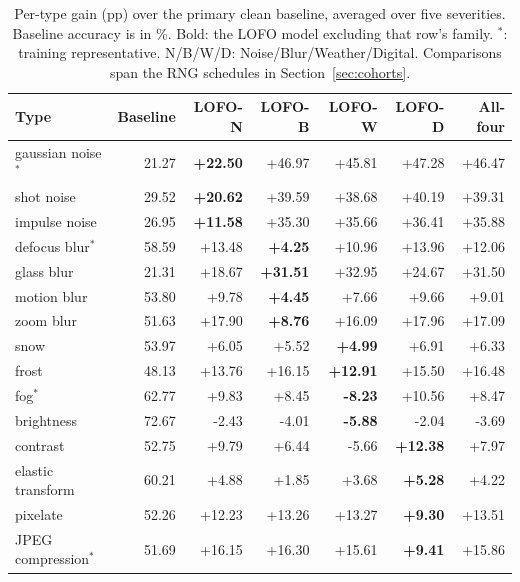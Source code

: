 \begin{table}[!htbp]
\caption{Per-type gain (pp) over the primary clean baseline, averaged over five severities. Baseline accuracy is in \%. Bold: the LOFO model excluding that row's family. $^{*}$: training representative. N/B/W/D: Noise/Blur/Weather/Digital. Comparisons span the RNG schedules in Section~\ref{sec:cohorts}.}
\label{tab:operators}
\centering
\setlength{\tabcolsep}{4pt}
\begin{tabular}{lrrrrrr}
\toprule
Type & Baseline & LOFO-N & LOFO-B & LOFO-W & LOFO-D & All-four \\
\midrule
gaussian noise$^{*}$ & 21.27 & \textbf{+22.50} & +46.97 & +45.81 & +47.28 & +46.47 \\
shot noise & 29.52 & \textbf{+20.62} & +39.59 & +38.68 & +40.19 & +39.31 \\
impulse noise & 26.95 & \textbf{+11.58} & +35.30 & +35.66 & +36.41 & +35.88 \\
\addlinespace[3pt]
defocus blur$^{*}$ & 58.59 & +13.48 & \textbf{+4.25} & +10.96 & +13.96 & +12.06 \\
glass blur & 21.31 & +18.67 & \textbf{+31.51} & +32.95 & +24.67 & +31.50 \\
motion blur & 53.80 & +9.78 & \textbf{+4.45} & +7.66 & +9.66 & +9.01 \\
zoom blur & 51.63 & +17.90 & \textbf{+8.76} & +16.09 & +17.96 & +17.09 \\
\addlinespace[3pt]
snow & 53.97 & +6.05 & +5.52 & \textbf{+4.99} & +6.91 & +6.33 \\
frost & 48.13 & +13.76 & +16.15 & \textbf{+12.91} & +15.50 & +16.48 \\
fog$^{*}$ & 62.77 & +9.83 & +8.45 & \textbf{-8.23} & +10.56 & +8.47 \\
brightness & 72.67 & -2.43 & -4.01 & \textbf{-5.88} & -2.04 & -3.69 \\
\addlinespace[3pt]
contrast & 52.75 & +9.79 & +6.44 & -5.66 & \textbf{+12.38} & +7.97 \\
elastic transform & 60.21 & +4.88 & +1.85 & +3.68 & \textbf{+5.28} & +4.22 \\
pixelate & 52.26 & +12.23 & +13.26 & +13.27 & \textbf{+9.30} & +13.51 \\
JPEG compression$^{*}$ & 51.69 & +16.15 & +16.30 & +15.61 & \textbf{+9.41} & +15.86 \\
\bottomrule
\end{tabular}
\end{table}
